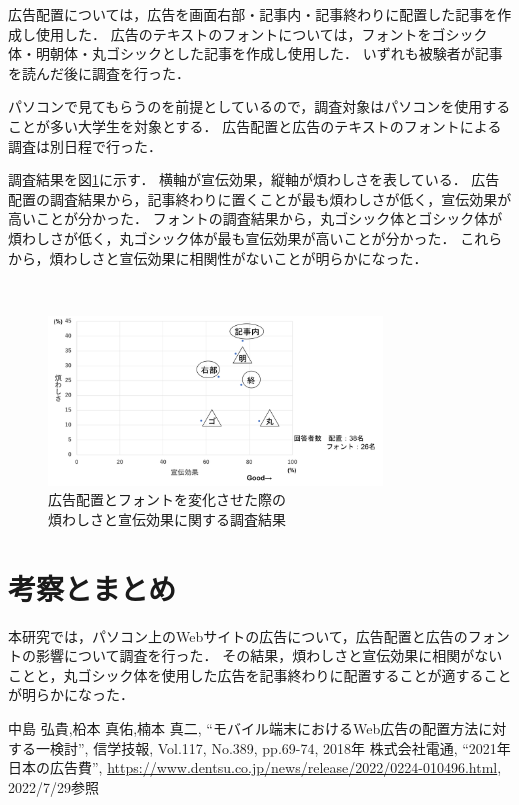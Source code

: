 \documentclass[twocolumn,10pt,a4j]{ltjsarticle}
\begin{document}
広告配置については，広告を画面右部・記事内・記事終わりに配置した記事を作成し使用した．
広告のテキストのフォントについては，フォントをゴシック体・明朝体・丸ゴシックとした記事を作成し使用した．
いずれも被験者が記事を読んだ後に調査を行った．

パソコンで見てもらうのを前提としているので，調査対象はパソコンを使用することが多い大学生を対象とする．
広告配置と広告のテキストのフォントによる調査は別日程で行った．

調査結果を図\ref{fig:結果}に示す．
横軸が宣伝効果，縦軸が煩わしさを表している．
広告配置の調査結果から，記事終わりに置くことが最も煩わしさが低く，宣伝効果が高いことが分かった．
フォントの調査結果から，丸ゴシック体とゴシック体が煩わしさが低く，丸ゴシック体が最も宣伝効果が高いことが分かった．
これらから，煩わしさと宣伝効果に相関性がないことが明らかになった．

　
\begin{figure}[h]
\begin{center}
 \includegraphics[height=45mm]{結果.png}
\end{center}
 \caption{広告配置とフォントを変化させた際の\\煩わしさと宣伝効果に関する調査結果}
 \label{fig:結果}
\end{figure}

\section{考察とまとめ}
本研究では，パソコン上のWebサイトの広告について，広告配置と広告のフォントの影響について調査を行った．
その結果，煩わしさと宣伝効果に相関がないことと，丸ゴシック体を使用した広告を記事終わりに配置することが適することが明らかになった．

\begin{thebibliography}{99}
 中島 弘貴,柗本 真佑,楠本 真二, ``モバイル端末におけるWeb広告の配置方法に対する一検討'', 信学技報, Vol.117, No.389, pp.69-74, 2018年
 株式会社電通, ``2021年 日本の広告費'', \url{https://www.dentsu.co.jp/news/release/2022/0224-010496.html}, 2022/7/29参照
\end{thebibliography}
\end{document}
